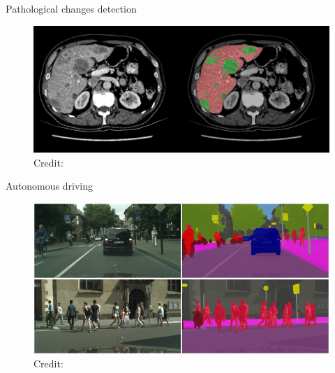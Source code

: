 \documentclass[12]{beamer}
\begin{document}
\begin{frame}{Pathological changes detection}

\begin{figure}
\includegraphics[width=\textwidth]{applications_medicine}
\hspace*{10pt}\hbox{\scriptsize Credit:}
\end{figure}

\end{frame}

\begin{frame}{Autonomous driving}

\begin{figure}
\includegraphics[width=\textwidth]{applications_driving}
\hspace*{5pt}\hbox{\scriptsize Credit:}
\end{figure}

\end{frame}
\end{document}
